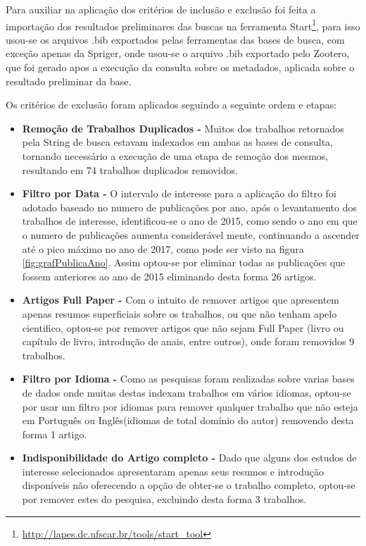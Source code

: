 \documentclass[tid,table]{texufpel} %
\begin{document}
Para auxiliar na aplicação dos critérios de inclusão e exclusão foi feita a importação dos resultados preliminares das buscas na ferramenta Start\footnote{\url{http://lapes.dc.ufscar.br/tools/start_tool}},
para isso usou-se os arquivos .bib exportados pelas ferramentas das bases de busca, com exceção apenas da Spriger, onde usou-se o arquivo .bib exportado pelo Zootero, que foi gerado apos a execução da consulta sobre os metadados, aplicada sobre o resultado preliminar da base.

Os critérios de exclusão foram aplicados seguindo a seguinte ordem e etapas:

\begin{itemize}
	\item  \textbf{Remoção de Trabalhos Duplicados - } Muitos dos trabalhos retornados pela String de busca estavam indexados em ambas as bases de consulta, tornando necessário a execução de uma etapa de remoção dos mesmos, resultando em 74 trabalhos duplicados removidos.
	
	\item  \textbf{Filtro por Data - } O intervalo de interesse para a aplicação do filtro foi adotado baseado no numero de publicações por ano, após o levantamento dos trabalhos de interesse, identificou-se o ano de 2015, como sendo o ano em que o numero de publicações aumenta considerável mente, continuando a ascender até o pico máximo no ano de 2017, como pode ser visto na figura \ref{fig:grafPublicaAno}. Assim optou-se por eliminar todas as publicações que fossem anteriores ao ano de 2015 eliminando desta forma 26 artigos.	
	
	\item  \textbf{Artigos Full Paper - } Com o intuito de remover artigos que apresentem apenas resumos superficiais sobre os trabalhos, ou que não tenham apelo cientifico, optou-se por remover artigos que não sejam Full Paper (livro ou capítulo de livro, introdução de anais, entre outros), onde foram removidos 9 trabalhos.
	
	\item  \textbf{Filtro por Idioma - } Como as pesquisas foram realizadas sobre varias bases de dados onde muitas destas indexam trabalhos em vários idiomas, optou-se por usar um filtro por idiomas para remover qualquer trabalho que não esteja em Português ou Inglês(idiomas de total domínio do autor) removendo desta forma 1 artigo.
	
	\item  \textbf{Indisponibilidade do Artigo completo - } Dado que alguns dos estudos de interesse selecionados apresentaram apenas seus resumos e introdução disponíveis não oferecendo a opção de obter-se o trabalho completo, optou-se por remover estes do pesquisa, excluindo desta forma 3 trabalhos.
	

\end{itemize}
\end{document}
